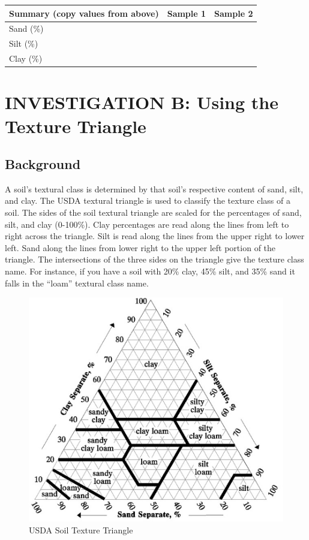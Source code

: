 \documentclass[
  letterpaper,
  DIV=11,
  numbers=noendperiod]{scrreprt}
\begin{document}
\begin{longtable}[]{@{}lll@{}}
\toprule()
\textbf{Summary (copy values from above)} & \textbf{Sample 1} &
\textbf{Sample 2} \\
\midrule()
\endhead
Sand (\%) & & \\
Silt (\%) & & \\
Clay (\%) & & \\
\bottomrule()
\end{longtable}

\hypertarget{investigation-b-using-the-texture-triangle}{%
\section{INVESTIGATION B: Using the Texture
Triangle}\label{investigation-b-using-the-texture-triangle}}

\hypertarget{background}{%
\subsection{Background}\label{background}}

A soil's textural class is determined by that soil's respective content
of sand, silt, and clay. The USDA textural triangle is used to classify
the texture class of a soil. The sides of the soil textural triangle are
scaled for the percentages of sand, silt, and clay (0-100\%). Clay
percentages are read along the lines from left to right across the
triangle. Silt is read along the lines from the upper right to lower
left. Sand along the lines from lower right to the upper left portion of
the triangle. The intersections of the three sides on the triangle give
the texture class name. For instance, if you have a soil with 20\% clay,
45\% silt, and 35\% sand it falls in the ``loam'' textural class name.

\begin{figure}

{\centering \includegraphics{./texture-triangle-Picture1.png}

}

\caption{\label{fig-triangle}USDA Soil Texture Triangle}

\end{figure}
\end{document}
